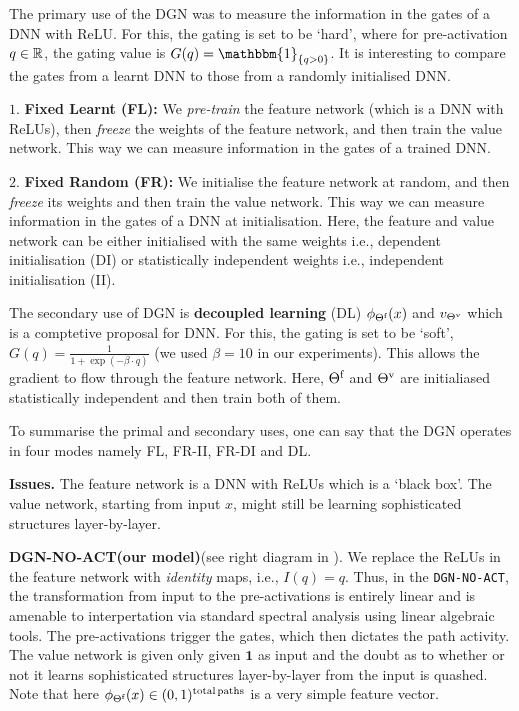 The primary use of the DGN was to measure the information in the gates of a DNN with ReLU. For this, the gating is set to be `hard', where for pre-activation $q\in\mathbb{R}$, the gating value is $G(q) = \mathbbm{1}_{\{q>0\}}$. It is interesting to compare the gates from a learnt DNN to those from a randomly initialised DNN.

$1.$ \textbf{Fixed Learnt (FL):} We \emph{pre-train} the feature network (which is a DNN with ReLUs), then \emph{freeze} the weights of the feature network, and then train the value network. This way we can measure information in the gates of a trained DNN.

$2.$ \textbf{Fixed Random (FR):} We initialise the feature network at random, and then \emph{freeze} its weights and then train the value network. This way we can measure information in the gates of a DNN at initialisation. Here, the feature and value network can be either initialised with the same weights i.e., dependent initialisation (DI) or statistically independent weights  i.e., independent initialisation (II). 

The secondary use of DGN is \textbf{decoupled learning} (DL) $\phi_{\Theta^{\textrm{f}}}(x)$ and $v_{{\Theta}^{\text{v}}}$ which is a comptetive proposal for DNN. For this, the gating is set to be `soft', $G(q)=\frac{1}{1+\exp({-\beta\cdot q})}$ (we used $\beta=10$ in our experiments). This allows the gradient to flow through the feature network. Here, $\Theta^{\textrm{f}}$ and ${\Theta}^{\text{v}}$ are initialiased statistically independent and then train both of them.

To summarise the primal and secondary uses, one can say that the DGN operates in four modes namely FL, FR-II, FR-DI and DL.

\textbf{Issues.} The feature network is a DNN with ReLUs which is a `black box'. The value network, starting from input $x$, might still be learning sophisticated structures layer-by-layer.

\textbf{DGN-NO-ACT(our model)}(see right diagram in ). We replace the ReLUs in the feature network with \emph{identity} maps, i.e., $I(q) = q$. Thus, in the \texttt{DGN-NO-ACT}, the transformation from input to the pre-activations is entirely linear and is amenable to interpertation via standard spectral analysis using linear algebraic tools. The pre-activations trigger the gates, which then dictates the path activity. The value network is given only given $\mathbf{1}$ as input and the doubt as to whether or not it learns sophisticated structures layer-by-layer from the input is quashed. Note that here $\phi_{\Theta^{\textrm{f}}}(x)\in(0,1)^{\text{total\,paths}}$ is a very simple feature vector.

